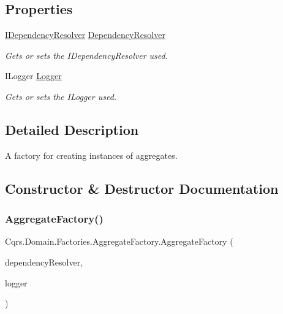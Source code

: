\subsection*{Properties}
\begin{DoxyCompactItemize}
\item 
\hyperlink{interfaceCqrs_1_1Configuration_1_1IDependencyResolver}{I\+Dependency\+Resolver} \hyperlink{classCqrs_1_1Domain_1_1Factories_1_1AggregateFactory_acae0733e4069776322e0c4cb5d335c09_acae0733e4069776322e0c4cb5d335c09}{Dependency\+Resolver}
\begin{DoxyCompactList}\small\item\em Gets or sets the I\+Dependency\+Resolver used. \end{DoxyCompactList}\item 
I\+Logger \hyperlink{classCqrs_1_1Domain_1_1Factories_1_1AggregateFactory_a78a24b5139cda7a07f938169a406f66e_a78a24b5139cda7a07f938169a406f66e}{Logger}
\begin{DoxyCompactList}\small\item\em Gets or sets the I\+Logger used. \end{DoxyCompactList}\end{DoxyCompactItemize}


\subsection{Detailed Description}
A factory for creating instances of aggregates. 



\subsection{Constructor \& Destructor Documentation}
\mbox{\label{classCqrs_1_1Domain_1_1Factories_1_1AggregateFactory_a8731bed6c8a8594c17bf0d32ff83939a_a8731bed6c8a8594c17bf0d32ff83939a}} 
\subsubsection{\texorpdfstring{Aggregate\+Factory()}{AggregateFactory()}}
{\footnotesize\ttfamily Cqrs.\+Domain.\+Factories.\+Aggregate\+Factory.\+Aggregate\+Factory (\begin{DoxyParamCaption}\item[{\hyperlink{interfaceCqrs_1_1Configuration_1_1IDependencyResolver}{I\+Dependency\+Resolver}}]{dependency\+Resolver,  }\item[{I\+Logger}]{logger }\end{DoxyParamCaption})}



